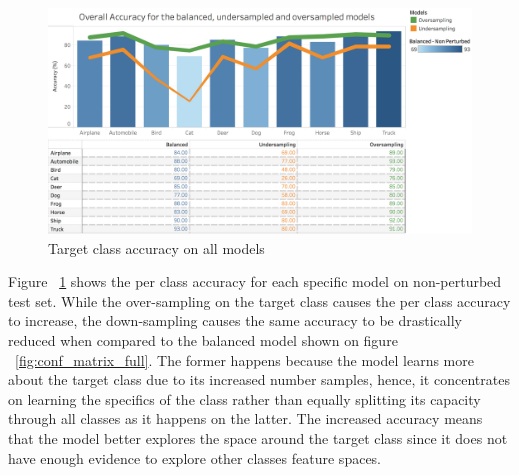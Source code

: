 \begin{figure}[!h]
	\centering
	\includegraphics[scale=0.3]{graph_non_pert.png}
	\caption{Target class accuracy on all models}
	\label{fig:acc_graph}
\end{figure}

Figure ~\ref{fig:acc_graph} shows the per class accuracy for each specific model on non-perturbed test set. While the over-sampling on the target class causes the per class accuracy to increase, the down-sampling causes the same accuracy to be drastically reduced when compared to the balanced model shown on figure ~\ref{fig:conf_matrix_full}. The former happens because the model learns more about the target class due to its increased number samples, hence, it concentrates on learning the specifics of the class rather than equally splitting its capacity through all classes as it happens on the latter. The increased accuracy means that the model better explores the space around the target class since it does not have enough evidence to explore other classes feature spaces.

